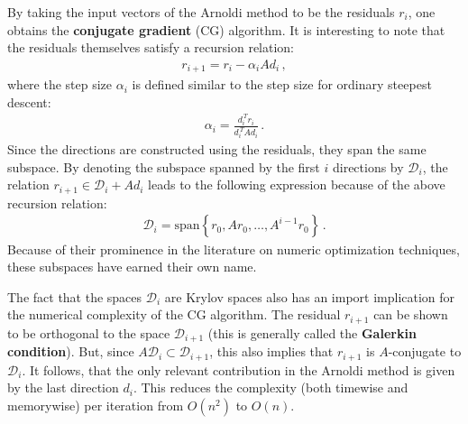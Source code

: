     By taking the input vectors of the Arnoldi method to be the residuals $r_i$, one obtains the \textbf{conjugate gradient} (CG) algorithm. It is interesting to note that the residuals themselves satisfy a recursion relation:
    \begin{gather}
        r_{i+1} = r_i - \alpha_iAd_i\,,
    \end{gather}
    where the step size $\alpha_i$ is defined similar to the step size for ordinary steepest descent:
    \begin{gather}
        \alpha_i = \frac{d_i^{\,T}r_i}{d_i^{\,T}\!Ad_i}\,.
    \end{gather}
    Since the directions are constructed using the residuals, they span the same subspace. By denoting the subspace spanned by the first $i$ directions by $\mathcal{D}_i$, the relation $r_{i+1}\in\mathcal{D}_i+Ad_i$ leads to the following expression because of the above recursion relation:
    \begin{gather}
        \mathcal{D}_i = \mathrm{span}\left\{r_0,Ar_0,\ldots,A^{i-1}r_0\right\}\,.
    \end{gather}
    Because of their prominence in the literature on numeric optimization techniques, these subspaces have earned their own name.

    The fact that the spaces $\mathcal{D}_i$ are Krylov spaces also has an import implication for the numerical complexity of the CG algorithm. The residual $r_{i+1}$ can be shown to be orthogonal to the space $\mathcal{D}_{i+1}$ (this is generally called the \textbf{Galerkin condition}). But, since $A\mathcal{D}_i\subset\mathcal{D}_{i+1}$, this also implies that $r_{i+1}$ is $A$-conjugate to $\mathcal{D}_i$. It follows, that the only relevant contribution in the Arnoldi method is given by the last direction $d_i$. This reduces the complexity (both timewise and memorywise) per iteration from $O(n^2)$ to $O(n)$.

